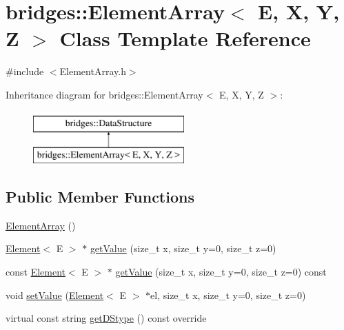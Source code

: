 \hypertarget{classbridges_1_1_element_array}{}\section{bridges\+:\+:Element\+Array$<$ E, X, Y, Z $>$ Class Template Reference}
\label{classbridges_1_1_element_array}


{\ttfamily \#include $<$Element\+Array.\+h$>$}

Inheritance diagram for bridges\+:\+:Element\+Array$<$ E, X, Y, Z $>$\+:\begin{figure}[H]
\begin{center}
\leavevmode
\includegraphics[height=2.000000cm]{classbridges_1_1_element_array}
\end{center}
\end{figure}
\subsection*{Public Member Functions}
\begin{DoxyCompactItemize}
\item 
\hyperlink{classbridges_1_1_element_array_aef0cfb2b7b35cd5b368e4c3987e41768}{Element\+Array} ()
\item 
\hyperlink{classbridges_1_1_element}{Element}$<$ E $>$ $\ast$ \hyperlink{classbridges_1_1_element_array_a45bac55f6f64a90eb61fd3faaf1aaffe}{get\+Value} (size\+\_\+t x, size\+\_\+t y=0, size\+\_\+t z=0)
\item 
const \hyperlink{classbridges_1_1_element}{Element}$<$ E $>$ $\ast$ \hyperlink{classbridges_1_1_element_array_a9e15557584b74ac7909cac00a2ab4fbe}{get\+Value} (size\+\_\+t x, size\+\_\+t y=0, size\+\_\+t z=0) const
\item 
void \hyperlink{classbridges_1_1_element_array_a202def849cd345d8b56ebcb31f332d25}{set\+Value} (\hyperlink{classbridges_1_1_element}{Element}$<$ E $>$ $\ast$el, size\+\_\+t x, size\+\_\+t y=0, size\+\_\+t z=0)
\item 
virtual const string \hyperlink{classbridges_1_1_element_array_adfb4e7d78ce01298ca66447e5c5abe6f}{get\+D\+Stype} () const override
\end{DoxyCompactItemize}


